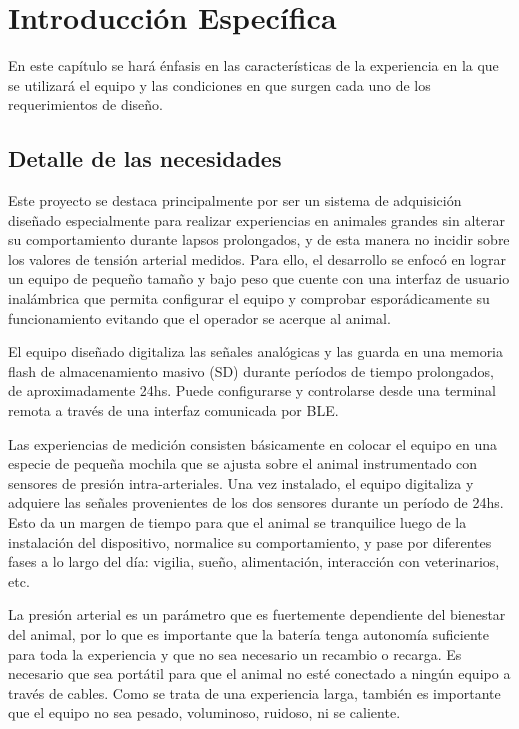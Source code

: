 \chapter{Introducción Específica} %

\label{Chapter2}


En este capítulo se hará énfasis en las características de la experiencia en la que se utilizará el equipo y las condiciones en que surgen cada uno de los requerimientos de diseño.

\section{Detalle de las necesidades}

Este proyecto se destaca principalmente por ser un sistema de adquisición diseñado especialmente para realizar experiencias en animales grandes sin alterar su comportamiento durante lapsos prolongados, y de esta manera no incidir sobre los valores de tensión arterial medidos. Para ello, el desarrollo se enfocó en lograr un equipo de pequeño tamaño y bajo peso que cuente con una interfaz de usuario inalámbrica que permita configurar el equipo y comprobar esporádicamente su funcionamiento evitando que el operador se acerque al animal. 

El equipo diseñado digitaliza las señales analógicas y las guarda en una memoria flash de almacenamiento masivo (SD) durante períodos de tiempo prolongados, de aproximadamente 24hs. Puede configurarse y controlarse desde una terminal remota a través de una interfaz comunicada por BLE.

Las experiencias de medición consisten básicamente en colocar el equipo en una especie de pequeña mochila que se ajusta sobre el animal instrumentado con sensores de presión intra-arteriales. Una vez instalado, el equipo digitaliza y adquiere las señales provenientes de los dos sensores durante un período de 24hs. Esto da un margen de tiempo para que el animal se tranquilice luego de la instalación del dispositivo, normalice su comportamiento, y pase por diferentes fases a lo largo del día: vigilia, sueño, alimentación, interacción con veterinarios, etc. 

La presión arterial es un parámetro que es fuertemente dependiente del bienestar del animal, por lo que es importante que la batería tenga autonomía suficiente para toda la experiencia y que no sea necesario un recambio o recarga. Es necesario que sea portátil para que el animal no esté conectado a ningún equipo a través de cables. Como se trata de una experiencia larga, también es importante que el equipo no sea pesado, voluminoso, ruidoso, ni se caliente. 

